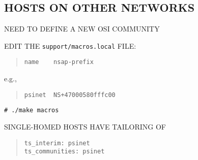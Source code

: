 \begin{bwslide}
\part*	{HOSTS ON OTHER NETWORKS}\bf

\begin{nrtc}
\item	NEED TO DEFINE A NEW OSI COMMUNITY
\end{nrtc}
\end{bwslide}


\begin{bwslide}

\begin{nrtc}
\item	EDIT THE \verb"support/macros.local" FILE:
\begin{quote}\small\begin{verbatim}
name    nsap-prefix
\end{verbatim}\end{quote}
	e.g.,
\begin{quote}\small\begin{verbatim}
psinet  NS+47000580fffc00
\end{verbatim}\end{quote}

\item	\verb"# ./make macros"

\item	SINGLE-HOMED HOSTS HAVE TAILORING OF
\begin{quote}\small\begin{verbatim}
ts_interim: psinet
ts_communities: psinet
\end{verbatim}\end{quote}
\end{nrtc}
\end{bwslide}
